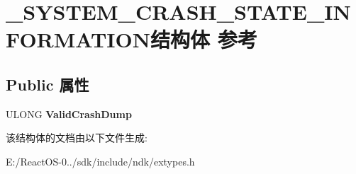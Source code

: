 \hypertarget{struct___s_y_s_t_e_m___c_r_a_s_h___s_t_a_t_e___i_n_f_o_r_m_a_t_i_o_n}{}\section{\+\_\+\+S\+Y\+S\+T\+E\+M\+\_\+\+C\+R\+A\+S\+H\+\_\+\+S\+T\+A\+T\+E\+\_\+\+I\+N\+F\+O\+R\+M\+A\+T\+I\+O\+N结构体 参考}
\label{struct___s_y_s_t_e_m___c_r_a_s_h___s_t_a_t_e___i_n_f_o_r_m_a_t_i_o_n}
\subsection*{Public 属性}
\begin{DoxyCompactItemize}
\item 
\mbox{\label{struct___s_y_s_t_e_m___c_r_a_s_h___s_t_a_t_e___i_n_f_o_r_m_a_t_i_o_n_a25dcadf19f477f758a991cbb9d8cc7d0}} 
U\+L\+O\+NG {\bfseries Valid\+Crash\+Dump}
\end{DoxyCompactItemize}


该结构体的文档由以下文件生成\+:\begin{DoxyCompactItemize}
\item 
E\+:/\+React\+O\+S-\/0../sdk/include/ndk/extypes.\+h\end{DoxyCompactItemize}
